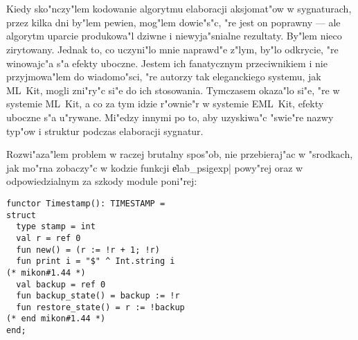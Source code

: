 \section{\secanegdote}
\label{sec:anegdote}

Kiedy sko"nczy"lem kodowanie algorytmu elaboracji aksjomat"ow w sygnaturach, 
przez kilka dni by"lem pewien, mog"lem dowie"s"c, "re jest on poprawny 
--- ale algorytm uparcie produkowa"l dziwne i niewyja"snialne rezultaty. 
By"lem nieco zirytowany.
Jednak to, co uczyni"lo mnie naprawd"e z"lym, 
by"lo odkrycie, "re winowajc"a s"a efekty uboczne.
Jestem ich fanatycznym przeciwnikiem i nie przyjmowa"lem do wiadomo"sci,
"re autorzy tak eleganckiego systemu, jak ML~Kit, mogli zni"ry"c si"e do ich stosowania.
Tymczasem okaza"lo si"e, "re w systemie ML~Kit, 
a co za tym idzie r"ownie"r w systemie EML~Kit,
efekty uboczne s"a u"rywane. Mi"edzy innymi po to, 
aby uzyskiwa"c "swie"re nazwy typ"ow i struktur podczas elaboracji sygnatur.

Rozwi"aza"lem problem w raczej brutalny spos"ob, nie przebieraj"ac w "srod\-kach,
jak mo"rna zobaczy"c w kodzie funkcji \|elab_psigexp| powy"rej
oraz w odpowiedzialnym za szkody module poni"rej: 
{\small
\begin{verbatim}
functor Timestamp(): TIMESTAMP =
struct
  type stamp = int
  val r = ref 0
  fun new() = (r := !r + 1; !r)
  fun print i = "$" ^ Int.string i
(* mikon#1.44 *)
  val backup = ref 0
  fun backup_state() = backup := !r
  fun restore_state() = r := !backup
(* end mikon#1.44 *)
end; 
\end{verbatim} 
} %













